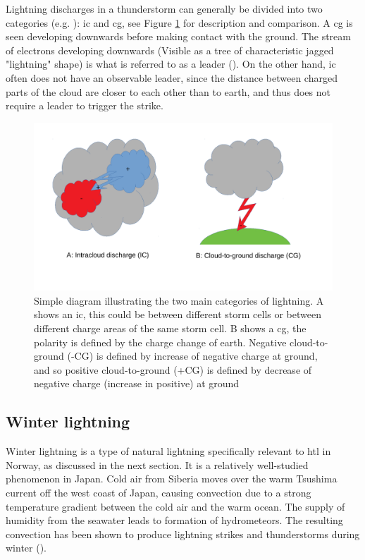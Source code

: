 Lightning discharges in a thunderstorm can generally be divided into two categories (e.g. \cite{lynn2011}): \acrfull{ic} and \acrfull{cg}, see Figure \ref{fig:lyntyper} for description and comparison. A \acrshort{cg} is seen developing downwards before making contact with the ground. The stream of electrons developing downwards (Visible as a tree of characteristic jagged "lightning" shape) is what is referred to as a leader (\cite{rakovBok}). On the other hand, \acrshort{ic} often does not have an observable leader, since the distance between charged parts of the cloud are closer to each other than to earth, and thus does not require a leader to trigger the strike.

\begin{figure}
    \centering
    \includegraphics[width=\textwidth]{Figures/lyntyper.pdf}
    \caption{Simple diagram illustrating the two main categories of lightning. A shows an \acrfull{ic}, this could be between different storm cells or between different charge areas of the same storm cell. B shows a \acrfull{cg}, the polarity is defined by the charge change of earth. Negative cloud-to-ground (-CG) is defined by increase of negative charge at ground, and so positive cloud-to-ground (+CG) is defined by decrease of negative charge (increase in positive) at ground}
    \label{fig:lyntyper}
\end{figure}

\subsection{Winter lightning}\label{sec:winter lightning}
Winter lightning is a type of natural lightning specifically relevant to \acrshort{htl} in Norway, as discussed in the next section. It is a relatively well-studied phenomenon in Japan. Cold air from Siberia moves over the warm Tsushima current off the west coast of Japan, causing convection due to a strong temperature gradient between the cold air and the warm ocean. The supply of humidity from the seawater leads to formation of hydrometeors. The resulting convection has been shown to produce lightning strikes and thunderstorms during winter (\cite{michimoto2007}).

